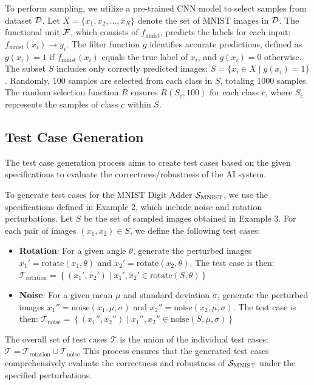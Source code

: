 \documentclass[10pt, conference, a4paper, final]{IEEEtran}
\begin{document}
\begin{example}
    To perform sampling, we utilize a pre-trained CNN model to select samples from dataset $\D$. Let $X = \{x_1, x_2, \dots, x_N\}$ denote the set of MNIST images in $\D$. The functional unit $\F$, which consists of $f_{\text{mnist}}$, predicts the labels for each input: $f_{\text{mnist}}(x_i) \rightarrow y_i$. The filter function $g$ identifies accurate predictions, defined as $g(x_i) = 1$ if $f_{\text{mnist}}(x_i)$ equals the true label of $x_i$, and $g(x_i) = 0$ otherwise. The subset $S$ includes only correctly predicted images: $S = \{x_i \in X \mid g(x_i) = 1\}$. Randomly, 100 samples are selected from each class in $S$, totaling 1000 samples. The random selection function $R$ ensures $R(S_c, 100)$ for each class $c$, where $S_c$ represents the samples of class $c$ within $S$.
  \end{example} 
  \subsection{Test Case Generation}
  The test case generation process aims to create test cases based on the given specifications to evaluate the correctness/robustness of the AI system.
  \begin{example}
    To generate test cases for the MNIST Digit Adder $\S_{\text{MNIST}}$, we use the specifications defined in Example 2, which include noise and rotation perturbations. Let $S$ be the set of sampled images obtained in Example 3. For each pair of images $(x_1, x_2) \in S$, we define the following test cases:
    \begin{itemize}
        \item \textbf{Rotation}: For a given angle $\theta$, generate the perturbed images $x_1' = \text{rotate}(x_1, \theta)$ and $x_2' = \text{rotate}(x_2, \theta)$. The test case is then:
        $\mathcal{T}_{\text{rotation}} = \left\{(x_1', x_2') \mid x_1', x_2' \in \text{rotate}(S, \theta)\right\}$
        \item \textbf{Noise}: For a given mean $\mu$ and standard deviation $\sigma$, generate the perturbed images $x_1'' = \text{noise}(x_1, \mu, \sigma)$ and $x_2'' = \text{noise}(x_2, \mu, \sigma)$. The test case is then:
        $\mathcal{T}_{\text{noise}} = \left\{(x_1'', x_2'') \mid x_1'', x_2'' \in \text{noise}(S, \mu, \sigma)\right\}$
    \end{itemize}
    The overall set of test cases $\mathcal{T}$ is the union of the individual test cases:
    $\mathcal{T} = \mathcal{T}_{\text{rotation}} \cup \mathcal{T}_{\text{noise}}$
    This process ensures that the generated test cases comprehensively evaluate the correctness and robustness of $\S_{\text{MNIST}}$ under the specified perturbations.
\end{example}
\end{document}
